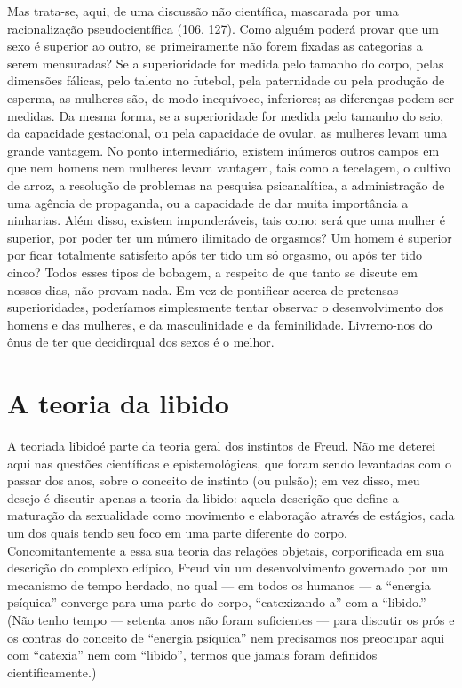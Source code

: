  Mas trata-se, aqui, de uma discussão não científica, mascarada por uma
racionalização pseudocientífica (106, 127). Como alguém poderá provar
que um sexo é superior ao outro, se primeiramente não forem fixadas as
categorias a serem mensuradas? Se a superioridade for medida pelo
tamanho do corpo, pelas dimensões fálicas, pelo talento no futebol,
pela paternidade ou pela produção de esperma, as mulheres são, de modo
inequívoco, inferiores; as diferenças podem ser medidas. Da mesma
forma, se a superioridade for medida pelo tamanho do seio, da
capacidade gestacional, ou pela capacidade de ovular, as mulheres levam
uma grande vantagem. No ponto intermediário, existem inúmeros outros
campos em que nem homens nem mulheres levam vantagem, tais como a
tecelagem, o cultivo de arroz, a resolução de problemas na pesquisa
psicanalítica, a administração de uma agência de propaganda, ou a
capacidade de dar muita importância a ninharias. Além disso, existem
imponderáveis, tais como: será que uma mulher é superior, por poder ter
um número ilimitado de orgasmos? Um homem é superior por ficar
totalmente satisfeito após ter tido um só orgasmo, ou após ter tido
cinco? Todos esses tipos de bobagem, a respeito de que tanto se discute
em nossos dias, não provam nada. Em vez de pontificar acerca de
pretensas superioridades, poderíamos simplesmente tentar observar o
desenvolvimento dos homens e das mulheres, e da masculinidade e da
feminilidade. Livremo-nos do ônus de ter que decidir\idxpenisprim[|)] qual dos sexos é o
melhor.


\section{A teoria da libido}

 A teoria\idxsociadese[|(] da libido\idxlibid[|(] é parte da teoria geral dos instintos de Freud.
Não me deterei aqui nas questões científicas e epistemológicas, que
foram sendo levantadas com o passar dos anos, sobre o conceito de
instinto (ou pulsão); em vez disso, meu desejo é discutir apenas a
teoria da libido: aquela descrição que define a maturação da
sexualidade como movimento e elaboração através de estágios, cada um
dos quais tendo seu foco em uma parte diferente do corpo.
Concomitantemente a essa sua teoria das relações objetais,
corporificada em sua descrição do complexo edípico, Freud viu um
desenvolvimento governado por um mecanismo de tempo herdado, no qual ---
em todos os humanos --- a ``energia psíquica''\idxenerg{} converge para uma parte do corpo,
``catexizando-a'' com a ``libido.'' (Não tenho tempo --- setenta anos
não foram suficientes --- para discutir os prós e os contras do conceito
de ``energia psíquica'' nem precisamos nos preocupar aqui com ``catexia'' nem com
``libido'', termos que jamais foram definidos cientificamente.)

